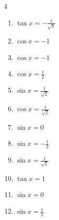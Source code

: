 \begin{multicols}{4}
\begin{enumerate}
  \item $\displaystyle \tan{x}  = -\frac{1}{\sqrt{3}}$


  \item $\displaystyle \cos{x}  = -1$


  \item $\displaystyle \cos{x}  = -1$


  \item $\displaystyle \cos{x}  = \frac{1}{2}$


  \item $\displaystyle \sin{x}  = \frac{1}{\sqrt{2}}$


  \item $\displaystyle \cos{x}  = \frac{1}{\sqrt{2}}$


  \item $\displaystyle \sin{x}  = 0$


  \item $\displaystyle \sin{x}  = -\frac{1}{2}$


  \item $\displaystyle \sin{x}  = \frac{1}{\sqrt{2}}$


  \item $\displaystyle \tan{x}  = 1$


  \item $\displaystyle \sin{x}  = 0$


  \item $\displaystyle \sin{x}  = \frac{1}{2}$


\end{enumerate}
\end{multicols}
